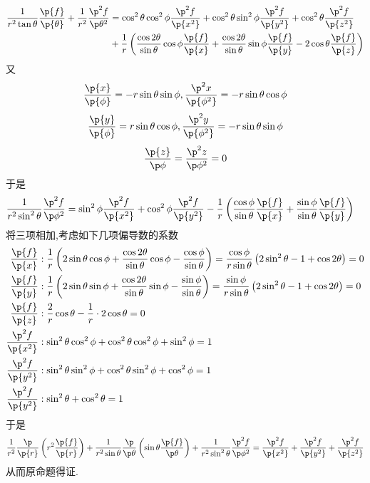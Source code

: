 \documentclass{ctexart}
\begin{document}
\begin{solution}[Proof.]
    $$\begin{aligned}
        \dfrac{1}{r^2\tan\theta}\dfrac{\p{f}}{\p{\theta}}+\dfrac{1}{r^2}\dfrac{\p^2f}{\p\theta^2}
        &= \cos^2\theta\cos^2\phi\dfrac{\p^2f}{\p{x^2}}+\cos^2\theta\sin^2\phi\dfrac{\p^2f}{\p{y^2}}+\cos^2\theta\dfrac{\p^2f}{\p{z^2}} \\
        &+ \dfrac{1}{r}\left(\dfrac{\cos2\theta}{\sin\theta}\cos\phi\dfrac{\p{f}}{\p{x}}+\dfrac{\cos2\theta}{\sin\theta}\sin\phi\dfrac{\p{f}}{\p{y}}-2\cos\theta\dfrac{\p{f}}{\p{z}}\right)
    \end{aligned}$$
    又
    $$\dfrac{\p{x}}{\p{\phi}}=-r\sin\theta\sin\phi,\dfrac{\p^2{x}}{\p{\phi^2}}=-r\sin\theta\cos\phi$$
    $$\dfrac{\p{y}}{\p{\phi}}=r\sin\theta\cos\phi,\dfrac{\p^2{y}}{\p{\phi^2}}=-r\sin\theta\sin\phi$$
    $$\dfrac{\p{z}}{\p\phi}=\dfrac{\p^2z}{\p\phi^2}=0$$
    于是
    $$\begin{aligned}
        \dfrac{1}{r^2\sin^2\theta}\dfrac{\p^2f}{\p\phi^2}
        &=\sin^2\phi\dfrac{\p^2f}{\p{x^2}}+\cos^2\phi\dfrac{\p^2f}{\p{y^2}}-\dfrac{1}{r}\left(\dfrac{\cos\phi}{\sin\theta}\dfrac{\p{f}}{\p{x}}+\dfrac{\sin\phi}{\sin\theta}\dfrac{\p{f}}{\p{y}}\right)
    \end{aligned}$$
    将三项相加,考虑如下几项偏导数的系数
    $$\begin{aligned}
        \dfrac{\p{f}}{\p{x}}&:\dfrac{1}{r}\left(2\sin\theta\cos\phi+\dfrac{\cos2\theta}{\sin\theta}\cos\phi-\dfrac{\cos\phi}{\sin\theta}\right)=\dfrac{\cos\phi}{r\sin\theta}\left(2\sin^2\theta-1+\cos2\theta\right)=0\\
        \dfrac{\p{f}}{\p{y}}&:\dfrac{1}{r}\left(2\sin\theta\sin\phi+\dfrac{\cos2\theta}{\sin\theta}\sin\phi-\dfrac{\sin\phi}{\sin\theta}\right)=\dfrac{\sin\phi}{r\sin\theta}\left(2\sin^2\theta-1+\cos2\theta\right)=0\\
        \dfrac{\p{f}}{\p{z}}&:\dfrac{2}{r}\cos\theta-\dfrac{1}{r}\cdot2\cos\theta=0\\
        \dfrac{\p^2{f}}{\p{x^2}}&:\sin^2\theta\cos^2\phi+\cos^2\theta\cos^2\phi+\sin^2\phi=1\\
        \dfrac{\p^2{f}}{\p{y^2}}&:\sin^2\theta\sin^2\phi+\cos^2\theta\sin^2\phi+\cos^2\phi=1\\
        \dfrac{\p^2{f}}{\p{y^2}}&:\sin^2\theta+\cos^2\theta=1
    \end{aligned}$$
    于是
    $$\dfrac{1}{r^2}\dfrac{\p}{\p{r}}\left(r^2\dfrac{\p{f}}{\p{r}}\right)+\dfrac{1}{r^2\sin\theta}\dfrac{\p}{\p\theta}\left(\sin\theta\dfrac{\p{f}}{\p\theta}\right)+\dfrac{1}{r^2\sin^2\theta}\dfrac{\p^2f}{\p\phi^2}
    =\dfrac{\p^2f}{\p{x^2}}+\dfrac{\p^2f}{\p{y^2}}+\dfrac{\p^2f}{\p{z^2}}$$
    从而原命题得证.
\end{solution}
\end{document}
